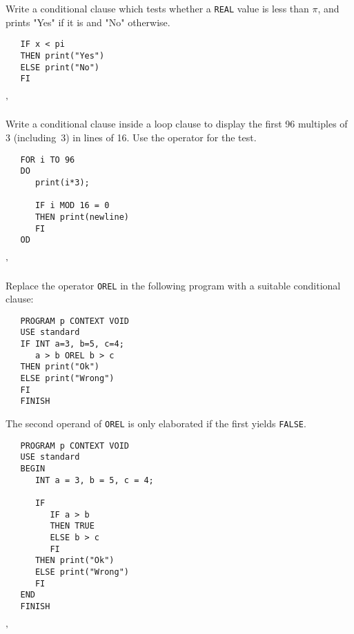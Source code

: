 \begin{exercise}
\item Write a conditional clause which tests whether a \verb|REAL|
value is less than $\pi$, and prints "Yes" if it is and "No"
otherwise. \ans \ %
\begin{verbatim}
   IF x < pi
   THEN print("Yes")
   ELSE print("No")
   FI
\end{verbatim}
'
\item Write a conditional clause inside a loop clause to display the
first 96 multiples of 3 (including~3) in lines of 16. Use the
operator  for the test. \ans \ %
\begin{verbatim}
   FOR i TO 96
   DO
      print(i*3);

      IF i MOD 16 = 0
      THEN print(newline)
      FI
   OD
\end{verbatim}
'
\item Replace the operator \verb|OREL| in the following program with
a suitable conditional clause:
\begin{verbatim}
   PROGRAM p CONTEXT VOID
   USE standard
   IF INT a=3, b=5, c=4;
      a > b OREL b > c
   THEN print("Ok")
   ELSE print("Wrong")
   FI
   FINISH
\end{verbatim}
\indent\ans The second operand of \verb|OREL| is only elaborated if
the first yields \verb|FALSE|.
\begin{verbatim}
   PROGRAM p CONTEXT VOID
   USE standard
   BEGIN
      INT a = 3, b = 5, c = 4;

      IF
         IF a > b
         THEN TRUE
         ELSE b > c
         FI
      THEN print("Ok")
      ELSE print("Wrong")
      FI
   END
   FINISH
\end{verbatim}
'
\end{exercise}


